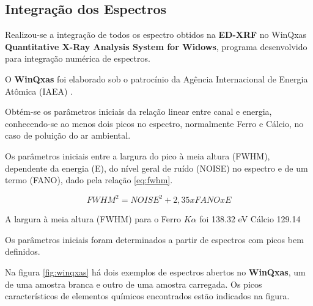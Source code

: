 



\subsection{Integração dos Espectros}

Realizou-se a integração de todos os espectro obtidos na \textbf{ED-XRF} no
WinQxas \textbf{Quantitative X-Ray Analysis System for Widows},
programa desenvolvido para integração numérica de espectros. 

O \textbf{WinQxas} foi elaborado sob o patrocínio da Agência Internacional 
de Energia Atômica (IAEA) \citep{capote2000}.

Obtém-se os parâmetros iniciais da relação linear entre canal e energia,
conhecendo-se ao menos dois picos no espectro, normalmente Ferro e Cálcio, 
no caso de poluição do ar ambiental. 

Os parâmetros iniciais entre a largura do pico à meia altura (FWHM),
dependente da energia (E), do nível geral de ruído (NOISE) no espectro 
e de um termo (FANO), dado pela relação \ref{eq:fwhm}. 

\begin{equation}
  \label{eq:fwhm}
   FWHM^2 = NOISE^2 + 2,35 x FANO  x E
\end{equation}

A largura à meia altura (FWHM) para o Ferro $K\alpha$ foi 138.32 eV
Cálcio 129.14

Os parâmetros iniciais foram determinados a partir de espectros com picos bem definidos.

Na figura \ref{fig:winqxas} há dois exemplos de espectros abertos no \textbf{WinQxas}, 
um de uma amostra branca e outro de uma amostra carregada. 
Os picos característicos de elementos químicos encontrados estão indicados na figura.

